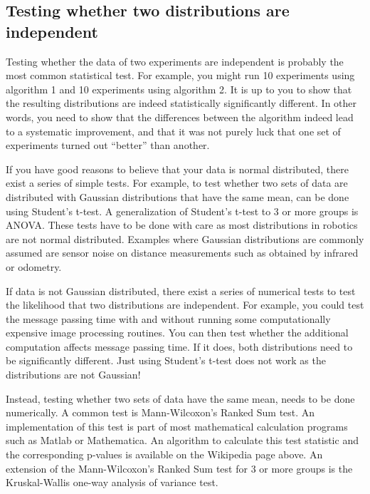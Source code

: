 \subsection{Testing whether two distributions are independent}
Testing whether the data of two experiments are independent is probably the most common statistical test. For example, you might run 10 experiments using algorithm 1 and 10 experiments using algorithm 2. It is up to you to show that the resulting distributions are indeed statistically significantly different. In other words, you need to show that the differences between the algorithm indeed lead to a systematic improvement, and that it was not purely luck that one set of experiments turned out ``better'' than another.

If you have good reasons to believe that your data is normal distributed, there exist a series of simple tests. For example, to test whether two sets of data are distributed with Gaussian distributions that have the same mean, can be done using Student's t-test. A generalization of Student's t-test to 3 or more groups is ANOVA. These tests have to be done with care as most distributions in robotics are not normal distributed. Examples where  Gaussian distributions are commonly assumed are sensor noise on distance measurements such as obtained by infrared or odometry.

If data is not Gaussian distributed, there exist a series of numerical tests to test the likelihood that two distributions are independent. For example, you could test the message passing time with and without running some computationally expensive image processing routines. You can then test whether the additional computation affects message passing time. If it does, both distributions need to be significantly different. Just using Student's t-test does not work as the distributions are not Gaussian!

Instead, testing whether two sets of data have the same mean, needs to be done numerically. A common test is Mann-Wilcoxon's Ranked Sum test. An implementation of this test is part of most mathematical calculation programs such as Matlab or Mathematica. An algorithm to calculate this test statistic and the corresponding p-values is available on the Wikipedia page above. An extension of the Mann-Wilcoxon's Ranked Sum test for 3 or more groups is the Kruskal-Wallis one-way analysis of variance test.

